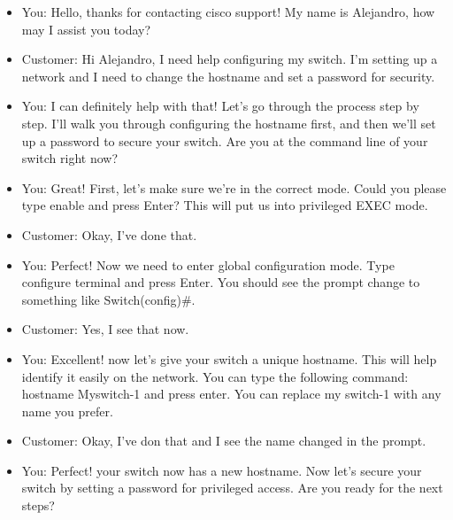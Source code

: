 \documentclass[a4paper,11pt]{article}
\begin{document}
\begin{tcolorbox}[colframe=blue!80, colback=blue!20, coltitle=black, title= Scenario:  Helping a customer configure a hostname and password for a cisco switch]
     
    \begin{itemize}
        \item You: Hello, thanks for contacting cisco support! My name is Alejandro, how may I assist you today?\\
        \item Customer: Hi Alejandro, I need help configuring my switch. I'm setting up a network and I need to change the hostname and set a password for security.\\
        \item You: I can definitely help with that! Let's go through the process step by step. I'll walk you through configuring the hostname first, and then we'll set up a password to secure your switch. Are you at the command line of your switch right now?\\
        \item You: Great! First, let's make sure we're in the correct mode. Could you please type enable and press Enter? This will put us into privileged EXEC mode.\\
        \item Customer: Okay, I've done that.\\
        \item You: Perfect! Now we need to enter global configuration mode. Type configure terminal and press Enter. You should see the prompt change to something like Switch(config)\#.\\
        \item Customer: Yes, I see that now.\\
        \item You: Excellent! now let's give your switch a unique hostname. This will help identify it easily on the network. You can type the following command: hostname Myswitch-1 and press enter. You can replace my switch-1 with any name you prefer.\\
        \item Customer: Okay, I've don that and I see the name changed in the prompt.\\
        \item You: Perfect! your switch now has a new hostname. Now let's secure your switch by setting a password for privileged access. Are you ready for the next steps?\\
    \end{itemize}
\end{tcolorbox}
\end{document}
